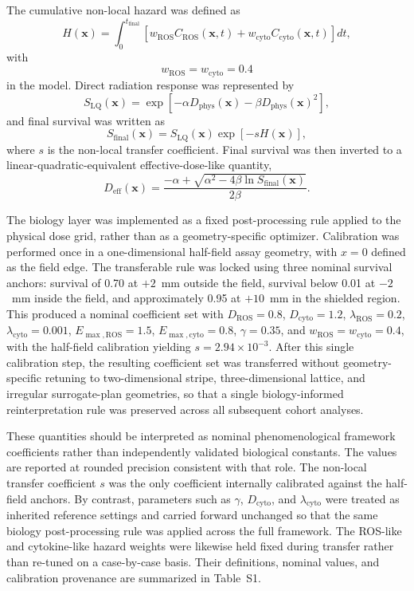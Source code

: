 \documentclass[10pt,a4paper]{article}
\newcommand{\Deff}{D_{\mathrm{eff}}}
\newcommand{\Dphys}{D_{\mathrm{phys}}}
\newcommand{\SF}{S_{\mathrm{final}}}
\newcommand{\SLQ}{S_{\mathrm{LQ}}}
\begin{document}
The cumulative non-local hazard was defined as
\begin{equation}
H(\mathbf{x})
=
\int_0^{t_{\mathrm{final}}}
\left[
w_{\mathrm{ROS}} C_{\mathrm{ROS}}(\mathbf{x},t)
+
w_{\mathrm{cyto}} C_{\mathrm{cyto}}(\mathbf{x},t)
\right] dt,
\end{equation}
with
\begin{equation}
w_{\mathrm{ROS}}=w_{\mathrm{cyto}}=0.4
\end{equation}
in the  model. Direct radiation response was represented by
\begin{equation}
\SLQ(\mathbf{x})
=
\exp\left[-\alpha \Dphys(\mathbf{x})-\beta \Dphys(\mathbf{x})^2\right],
\end{equation}
and final survival was written as
\begin{equation}
\SF(\mathbf{x})
=
\SLQ(\mathbf{x})\exp[-sH(\mathbf{x})],
\end{equation}
where $s$ is the non-local transfer coefficient. Final survival was then inverted to a linear-quadratic-equivalent effective-dose-like quantity,
\begin{equation}
\Deff(\mathbf{x})
=
\frac{-\alpha+\sqrt{\alpha^2-4\beta\ln \SF(\mathbf{x})}}{2\beta}.
\end{equation}

The biology layer was implemented as a fixed post-processing rule applied to the physical dose grid, rather than as a geometry-specific optimizer. Calibration was performed once in a one-dimensional half-field assay geometry, with $x=0$ defined as the field edge. The transferable rule was locked using three nominal survival anchors: survival of 0.70 at $+2$~mm outside the field, survival below 0.01 at $-2$~mm inside the field, and approximately 0.95 at $+10$~mm in the shielded region. This produced a nominal coefficient set with $D_{\mathrm{ROS}}=0.8$, $D_{\mathrm{cyto}}=1.2$, $\lambda_{\mathrm{ROS}}=0.2$, $\lambda_{\mathrm{cyto}}=0.001$, $E_{\max,\mathrm{ROS}}=1.5$, $E_{\max,\mathrm{cyto}}=0.8$, $\gamma=0.35$, and $w_{\mathrm{ROS}}=w_{\mathrm{cyto}}=0.4$, with the half-field calibration yielding $s=2.94\times10^{-3}$. After this single calibration step, the resulting coefficient set was transferred without geometry-specific retuning to two-dimensional stripe, three-dimensional lattice, and irregular surrogate-plan geometries, so that a single biology-informed reinterpretation rule was preserved across all subsequent cohort analyses.

These quantities should be interpreted as nominal phenomenological framework coefficients rather than independently validated biological constants. The values are reported at rounded precision consistent with that role. The non-local transfer coefficient $s$ was the only coefficient internally calibrated against the half-field anchors. By contrast, parameters such as $\gamma$, $D_{\mathrm{cyto}}$, and $\lambda_{\mathrm{cyto}}$ were treated as inherited reference settings and carried forward unchanged so that the same biology post-processing rule was applied across the full framework. The ROS-like and cytokine-like hazard weights were likewise held fixed during transfer rather than re-tuned on a case-by-case basis. Their definitions, nominal values, and calibration provenance are summarized in Table~S1.
\end{document}
